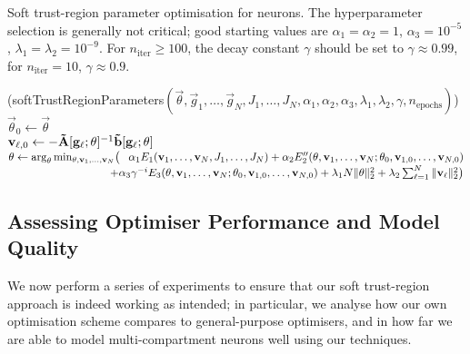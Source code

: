 \begin{algorithm}[t]
	\begin{minipage}{0.98\textwidth}
	\caption[Soft trust-region parameter optimisation for $n$-LIF neurons]{Soft trust-region parameter optimisation for \nlif neurons. 
	The hyperparameter selection is generally not critical; good starting values are $\alpha_1 = \alpha_2 = 1$, $\alpha_3 = 10^{-5}$, $\lambda_1 = \lambda_2 = 10^{-9}$.
	For $n_\mathrm{iter} \geq 100$, the decay constant $\gamma$ should be set to $\gamma \approx 0.99$, for $n_\mathrm{iter} = 10$, $\gamma \approx 0.9$.
	}
	\label{alg:nlif_tr_parameters}
	\end{minipage}
	\sffamily\small
	\Begin(softTrustRegionParameters${(\vec \theta, \vec g_1, \ldots, \vec g_N, J_1, \ldots, J_N, \alpha_1, \alpha_2, \alpha_3, \lambda_1, \lambda_2, \gamma, n_\mathrm{epochs})}$)
	{
		{
			$\vec \theta_0 \gets \vec \theta$ \\
			{
				$\vec v_{\ell, 0} \gets -\mrA[\vec g_\ell; \vec \theta]^{-1} \vrb[\vec g_\ell; \vec \theta]$
			}
			$\vec \theta \gets
				\arg_{\vec \theta}\min_{\vec \theta, \vec v_1, \ldots, \vec v_N}
					\bigl( \hphantom{+} \alpha_1 E_1(\vec v_1, \ldots, \vec v_{N}, J_1, \ldots, J_N)
				+ \alpha_2 E_2''(\vec \theta, \vec v_1, \ldots, \vec v_N; \vec \theta_0, \vec v_{1,0}, \ldots, \vec v_{N, 0})$ \\
			$\hspace{9.15em} + \alpha_3 \gamma^{-i} E_3(\vec \theta, \vec v_1, \ldots, \vec v_N; \vec \theta_0, \vec v_{1,0}, \ldots, \vec v_{N, 0}) + \lambda_1 N \|\vec \theta\|_2^2 + \lambda_2 \sum_{\ell = 1}^N \| \vec v_{\ell} \|_2^2 \bigr)$
		}
		\Return{$\vec \theta$}
	}
\end{algorithm}

\subsection{Assessing Optimiser Performance and Model Quality}
\label{sec:nlif_opt_parameters_experiment}

We now perform a series of experiments to ensure that our soft trust-region approach is indeed working as intended; in particular, we analyse how our own optimisation scheme compares to general-purpose optimisers, and in how far we are able to model multi-compartment neurons well using our techniques.

